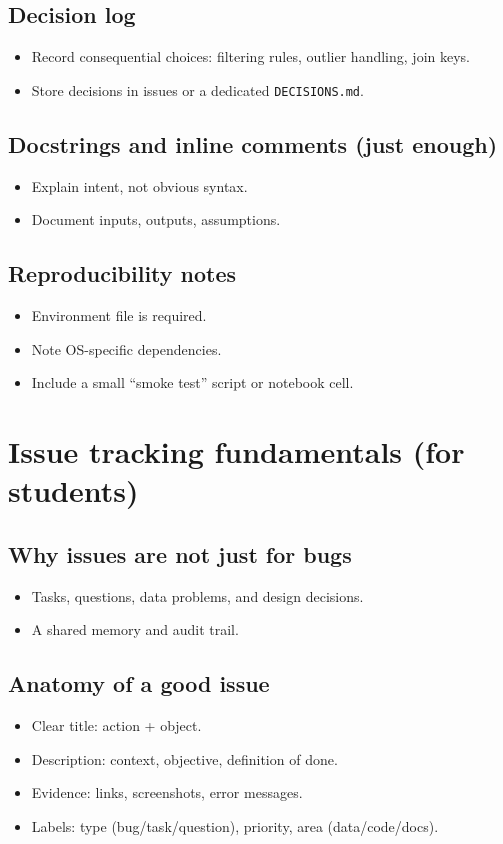 \subsection{Decision log}
\begin{itemize}
\item Record consequential choices: filtering rules, outlier handling, join keys.
\item Store decisions in issues or a dedicated \texttt{DECISIONS.md}.
\end{itemize}

\subsection{Docstrings and inline comments (just enough)}
\begin{itemize}
\item Explain intent, not obvious syntax.
\item Document inputs, outputs, assumptions.
\end{itemize}

\subsection{Reproducibility notes}
\begin{itemize}
\item Environment file is required.
\item Note OS-specific dependencies.
\item Include a small ``smoke test'' script or notebook cell.
\end{itemize}

\section{Issue tracking fundamentals (for students)}
\subsection{Why issues are not just for bugs}
\begin{itemize}
\item Tasks, questions, data problems, and design decisions.
\item A shared memory and audit trail.
\end{itemize}

\subsection{Anatomy of a good issue}
\begin{itemize}
\item Clear title: action + object.
\item Description: context, objective, definition of done.
\item Evidence: links, screenshots, error messages.
\item Labels: type (bug/task/question), priority, area (data/code/docs).
\end{itemize}

